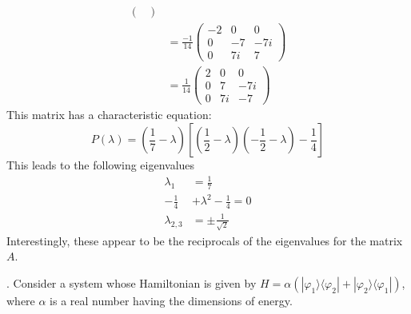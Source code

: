 \documentclass[a4paper, 11pt]{article}
\newcommand{\ket}[1]{|#1\rangle}
\newcommand{\bra}[1]{\langle #1 |}
\newenvironment{solution}{%
	\begin{list}{}{%
			\setlength{\topsep}{0pt}%
			\setlength{\leftmargin}{1.5cm}%
			\setlength{\rightmargin}{1.5cm}%
			\setlength{\listparindent}{\parindent}%
			\setlength{\itemindent}{\parindent}%
			\setlength{\parsep}{\parskip}%
	}%
	\item[]}{\end{list}}
\begin{document}
\begin{solution}
\begin{align*}
\begin{pmatrix}
				\end{pmatrix} \\ 
				&= \frac{-1}{14}\begin{pmatrix}
					-2 & 0 & 0 \\ 
					0 & -7 & -7i \\ 
					0 & 7i & 7
				\end{pmatrix} \\ 
				&= \frac{1}{14}\begin{pmatrix}
					2 & 0 & 0 \\ 
					0 & 7 & -7i \\ 
					0 & 7i & -7
				\end{pmatrix}	
		\end{align*}
		This matrix has a characteristic equation: 
			\begin{equation*}
				P(\lambda) = (\frac{1}{7}-\lambda)[(\frac{1}{2}-\lambda)(-\frac{1}{2}-\lambda)-\frac{1}{4}]
			\end{equation*}
		This leads to the following eigenvalues
			\begin{align*}
				\lambda_1 &= \frac{1}{7} \\ 
				-\frac{1}{4} &+ \lambda^2 - \frac{1}{4} = 0 \\ 
				\lambda_{2,3}&= \pm \frac{1}{\sqrt{2}}
			\end{align*}
		Interestingly, these appear to be the reciprocals of the eigenvalues for the matrix $A$. \\
	\end{solution}

. Consider a system whose Hamiltonian is given by $H = \alpha(\ket{\varphi_1}\bra{\varphi_2}+\ket{\varphi_2}\bra{\varphi_1})$, where $\alpha$ is a real number having the dimensions of energy. \\ 
\end{document}
